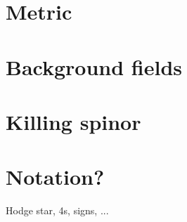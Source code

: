 \appendix
\section{Metric}\label{sec:metric}


\section{Background fields}


\section{Killing spinor}\label{sec:KillingSpinor}


\section{Notation?}
Hodge star, 4s, signs, ...

